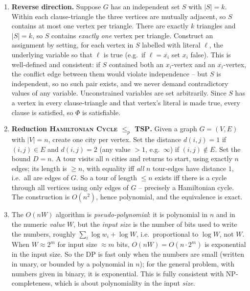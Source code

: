\documentclass[11pt]{article}
\begin{document}
\begin{enumerate}[label=\textbf{A\arabic*.}, leftmargin=2.2em]
\textbf{Forward direction.} Suppose $\Phi$ has a satisfying assignment. Each clause has at
least one literal evaluating to true; pick one such literal per clause and take its vertex.
This selects exactly one vertex from each triangle (so no triangle edge is violated, since
triangle edges only connect vertices \emph{within} a clause and we picked one), and no two
selected vertices conflict: a conflict edge connects $x_i$ and $\overline{x_i}$, but under a
single assignment these literals cannot both be true, so we never selected both. Hence the
selected $k$ vertices form an independent set of size $k$.

\item \textbf{Reverse direction.} Suppose $G$ has an independent set $S$ with $|S| = k$.
Within each clause-triangle the three vertices are mutually adjacent, so $S$ contains at
most one vertex per triangle. There are exactly $k$ triangles and $|S| = k$, so $S$ contains
\emph{exactly one} vertex per triangle. Construct an assignment by setting, for each vertex
in $S$ labelled with literal $\ell$, the underlying variable so that $\ell$ is true (e.g.\
if $\ell = \overline{x_i}$ set $x_i$ false). This is well-defined and consistent: if $S$
contained both an $x_i$-vertex and an $\overline{x_i}$-vertex, the conflict edge between
them would violate independence -- but $S$ is independent, so no such pair exists, and we
never demand contradictory values of any variable. Unconstrained variables are set
arbitrarily. Since $S$ has a vertex in every clause-triangle and that vertex's literal is
made true, every clause is satisfied, so $\Phi$ is satisfiable.

\item \textbf{Reduction \textsc{Hamiltonian Cycle} $\le_p$ \textsc{TSP}.} Given a graph $G
= (V, E)$ with $|V| = n$, create one city per vertex. Set the distance $d(i, j) = 1$ if
$(i, j) \in E$ and $d(i, j) = 2$ (any value $> 1$, e.g.\ $\infty$) if $(i, j) \notin E$.
Set the bound $D = n$. A tour visits all $n$ cities and returns to start, using exactly $n$
edges; its length is $\ge n$, with equality iff \emph{all} $n$ tour-edges have distance $1$,
i.e.\ all are edges of $G$. So a tour of length $\le n$ exists iff there is a cycle through
all vertices using only edges of $G$ -- precisely a Hamiltonian cycle. The construction is
$O(n^2)$, hence polynomial, and the equivalence is exact.

\item The $O(nW)$ algorithm is \emph{pseudo-polynomial}: it is polynomial in $n$ and in the
numeric \emph{value} $W$, but the \emph{input size} is the number of bits used to write the
numbers, roughly $\sum_i \log w_i + \log W$, i.e.\ proportional to $\log W$, not $W$. When
$W \approx 2^{m}$ for input size $\approx m$ bits, $O(nW) = O(n \cdot 2^m)$ is exponential
in the input size. So the DP is fast only when the numbers are small (written in unary, or
bounded by a polynomial in $n$); for the general problem, with numbers given in binary, it
is exponential. This is fully consistent with NP-completeness, which is about polynomiality
in the input \emph{size}.


\end{enumerate}
\end{document}
